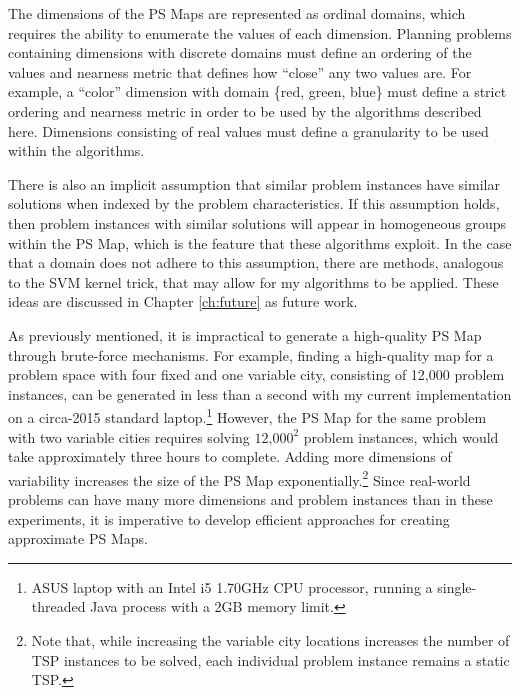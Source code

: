 The dimensions of the PS Maps are represented as ordinal domains, which requires the ability to enumerate the values of each dimension.  Planning problems containing dimensions with discrete domains must define an ordering of the values and nearness metric that defines how ``close'' any two values are.  For example, a ``color'' dimension with domain \{red, green, blue\} must define a strict ordering and nearness metric in order to be used by the algorithms described here.  Dimensions consisting of real values must define a granularity to be used within the algorithms.

There is also an implicit assumption that similar problem instances have similar solutions when indexed by the problem characteristics.  If this assumption holds, then problem instances with similar solutions will appear in homogeneous groups within the PS Map, which is the feature that these algorithms exploit. In the case that a domain does not adhere to this assumption, there are methods, analogous to the SVM kernel trick, that may allow for my algorithms to be applied.  These ideas are discussed in Chapter \ref{ch:future}  as future work.


As previously mentioned, it is impractical to generate a high-quality PS Map through brute-force mechanisms.  For example, finding a high-quality map for a problem space with four fixed and one variable city, consisting of 12,000 problem instances, can be generated in less than a second with my current implementation on a circa-2015 standard laptop.\footnote{ASUS laptop with an Intel i5 1.70GHz CPU processor, running a single-threaded Java process with a 2GB memory limit.}  However, the PS Map for the same problem with two variable cities requires solving $\textrm{12,000}^{\textrm{2}}$ problem instances, which would take approximately three hours to complete.    Adding more dimensions of variability increases the size of the PS Map exponentially.\footnote{Note that, while increasing the variable city locations increases the number of TSP instances to be solved, each individual problem instance remains a static TSP.}  Since real-world problems can have many more dimensions and problem instances than in these experiments, it is imperative to develop efficient approaches for creating approximate PS Maps.



